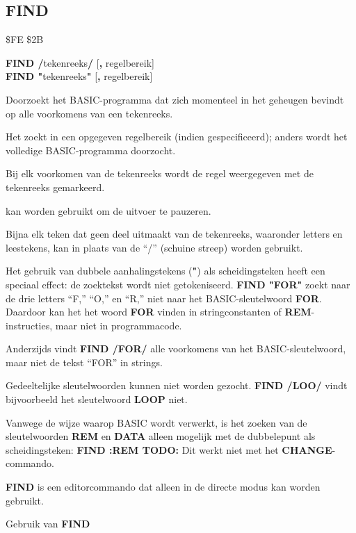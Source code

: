 \newpage
\subsection{FIND}
\begin{description}[leftmargin=2cm,style=nextline]
\item [Token:]    \$FE \$2B

\item [Formaat:]   {\bf FIND /}tekenreeks{\bf/} [{\bf,} regelbereik] \\		            {\bf FIND "}tekenreeks{\bf"} [{\bf,} regelbereik]

\item [Gebruik:]    Doorzoekt het BASIC-programma dat zich momenteel in het geheugen bevindt op alle voorkomens van een tekenreeks.

                  Het zoekt in een opgegeven regelbereik (indien gespecificeerd); anders wordt het volledige BASIC-programma doorzocht.

                  Bij elk voorkomen van de tekenreeks wordt de regel weergegeven met de tekenreeks gemarkeerd.

                   kan worden gebruikt om de uitvoer te pauzeren.

\item [Opmerkingen:]  Bijna elk teken dat geen deel uitmaakt van de tekenreeks, waaronder letters en leestekens, kan in plaats van de ``/'' (schuine streep) worden gebruikt.

                  Het gebruik van dubbele aanhalingstekens ({\bf "}) als scheidingsteken heeft een speciaal effect: de zoektekst wordt niet getokeniseerd. {\bf FIND "FOR"} zoekt naar de drie letters ``F,'' ``O,'' en ``R,'' niet naar het BASIC-sleutelwoord {\bf FOR}. Daardoor kan het het woord {\bf FOR} vinden in stringconstanten of {\bf REM}-instructies, maar niet in programmacode.

                  Anderzijds vindt {\bf FIND /FOR/} alle voorkomens van het BASIC-sleutelwoord, maar niet de tekst ``FOR'' in strings.

                  Gedeeltelijke sleutelwoorden kunnen niet worden gezocht. {\bf FIND /LOO/} vindt bijvoorbeeld het sleutelwoord {\bf LOOP} niet.

                  Vanwege de wijze waarop BASIC wordt verwerkt, is het zoeken van de sleutelwoorden {\bf REM} en {\bf DATA} alleen mogelijk met de dubbelepunt als scheidingsteken: {\bf FIND :REM TODO:} Dit werkt niet met het {\bf CHANGE}-commando.

                  {\bf FIND} is een editorcommando dat alleen in de directe modus kan worden gebruikt.

\item [Voorbeeld:]  Gebruik van {\bf FIND}

\end{description}

